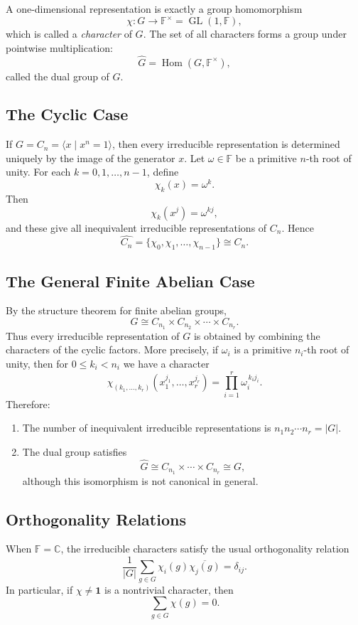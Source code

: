 \documentclass[12pt,a4paper]{ctexart}
\theoremstyle{remark}
\begin{document}
A one-dimensional representation is exactly a group homomorphism
\[
  \chi:G\longrightarrow \mathbb{F}^{\times}
  =\operatorname{GL}(1,\mathbb{F}),
\]
which is called a \emph{character} of \(G\). The set of all characters forms
a group under pointwise multiplication:
\[
  \widehat{G}=\operatorname{Hom}(G,\mathbb{F}^{\times}),
\]
called the dual group of \(G\).

\subsection*{The Cyclic Case}

If \(G=C_n=\langle x\mid x^n=1\rangle\), then every irreducible representation
is determined uniquely by the image of the generator \(x\). Let
\(\omega\in\mathbb{F}\) be a primitive \(n\)-th root of unity. For each
\(k=0,1,\dots,n-1\), define
\[
  \chi_k(x)=\omega^k.
\]
Then
\[
  \chi_k(x^j)=\omega^{kj},
\]
and these give all inequivalent irreducible representations of \(C_n\). Hence
\[
  \widehat{C_n}=\{\chi_0,\chi_1,\dots,\chi_{n-1}\}\cong C_n.
\]

\subsection*{The General Finite Abelian Case}

By the structure theorem for finite abelian groups,
\[
  G\cong C_{n_1}\times C_{n_2}\times \cdots \times C_{n_r}.
\]
Thus every irreducible representation of \(G\) is obtained by combining the
characters of the cyclic factors. More precisely, if \(\omega_i\) is a
primitive \(n_i\)-th root of unity, then for
\(0\leq k_i<n_i\) we have a character
\[
  \chi_{(k_1,\dots,k_r)}(x_1^{j_1},\dots,x_r^{j_r})
  =
  \prod_{i=1}^r \omega_i^{\,k_i j_i}.
\]
Therefore:
\begin{enumerate}[label=\arabic*.]
  \item The number of inequivalent irreducible representations is
  \(n_1n_2\cdots n_r=|G|\).
  \item The dual group satisfies
  \[
    \widehat{G}\cong C_{n_1}\times\cdots\times C_{n_r}\cong G,
  \]
  although this isomorphism is not canonical in general.
\end{enumerate}

\subsection*{Orthogonality Relations}

When \(\mathbb{F}=\mathbb{C}\), the irreducible characters satisfy the usual
orthogonality relation
\[
  \frac{1}{|G|}\sum_{g\in G}\chi_i(g)\overline{\chi_j(g)}=\delta_{ij}.
\]
In particular, if \(\chi\neq \mathbf{1}\) is a nontrivial character, then
\[
  \sum_{g\in G}\chi(g)=0.
\]
\end{document}
